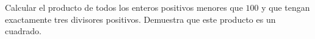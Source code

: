 Calcular el producto de todos los enteros positivos menores que $100$ y que tengan exactamente tres divisores positivos. Demuestra que este producto es un cuadrado.
